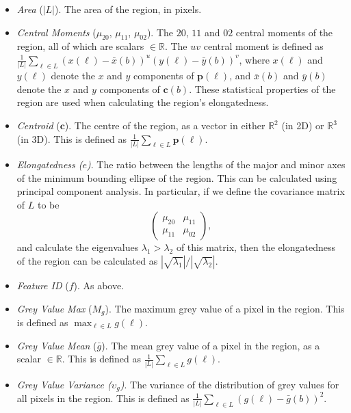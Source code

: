 \begin{itemize}

\item \emph{Area} ($|L|$). The area of the region, in pixels.

\item \emph{Central Moments} ($\mu_{20}$, $\mu_{11}$, $\mu_{02}$). The $20$, $11$ and $02$ central moments of the region, all of which are scalars $\in \mathbb{R}$. The $uv$ central moment is defined as $\displaystyle \frac{1}{|L|} \sum_{\ell \in L} (x(\ell) - \bar{x}(b))^u (y(\ell) - \bar{y}(b))^v$, where $x(\ell)$ and $y(\ell)$ denote the $x$ and $y$ components of $\mathbf{p}(\ell)$, and $\bar{x}(b)$ and $\bar{y}(b)$ denote the $x$ and $y$ components of $\mathbf{c}(b)$. These statistical properties of the region are used when calculating the region's elongatedness.

\item \emph{Centroid} ($\mathbf{c}$). The centre of the region, as a vector in either $\mathbb{R}^2$ (in 2D) or $\mathbb{R}^3$ (in 3D). This is defined as $\displaystyle \frac{1}{|L|} \sum_{\ell \in L} \mathbf{p}(\ell)$.

\item \emph{Elongatedness ($e$)}. The ratio between the lengths of the major and minor axes of the minimum bounding ellipse of the region. This can be calculated using principal component analysis. In particular, if we define the covariance matrix of $L$ to be
%
\[
\left(
\begin{array}{cc}
\mu_{20} & \mu_{11} \\
\mu_{11} & \mu_{02}
\end{array}
\right),
\]
%
and calculate the eigenvalues $\lambda_1 > \lambda_2$ of this matrix, then the elongatedness of the region can be calculated as $|\sqrt{\lambda_1}| / |\sqrt{\lambda_2}|$.

\item \emph{Feature ID} ($f$). As above.

\item \emph{Grey Value Max} ($M_g$). The maximum grey value of a pixel in the region. This is defined as $\displaystyle \max_{\ell \in L} g(\ell)$.

\item \emph{Grey Value Mean} ($\bar{g}$). The mean grey value of a pixel in the region, as a scalar $\in \mathbb{R}$. This is defined as $\displaystyle \frac{1}{|L|} \sum_{\ell \in L} g(\ell)$.

\item \emph{Grey Value Variance ($\upsilon_g$)}. The variance of the distribution of grey values for all pixels in the region. This is defined as $\displaystyle \frac{1}{|L|} \sum_{\ell \in L} (g(\ell) - \bar{g}(b))^2$.


\end{itemize}
